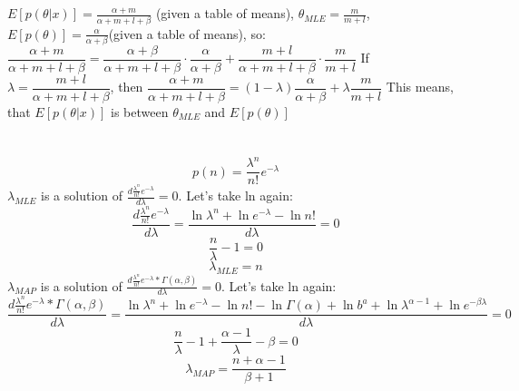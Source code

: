 \documentclass[11pt]{article}
\newcommand{\exercise}{\section{}}
\begin{document}
\exercise
$E[p(\theta|x)]=\frac{\alpha+m}{\alpha+m+l+\beta}$ (given a table of means), $\theta_{MLE}=\frac{m}{m+l}$, $E[p(\theta)]=\frac{\alpha}{\alpha+\beta}$(given a table of means), so: \newline
$\dfrac{\alpha+m}{\alpha+m+l+\beta}=\dfrac{\alpha+\beta}{\alpha+m+l+\beta}\cdot\dfrac{\alpha}{\alpha+\beta}+\dfrac{m+l}{\alpha+m+l+\beta}\cdot\dfrac{m}{m+l}$\newline\newline
If $\lambda=\dfrac{m+l}{\alpha+m+l+\beta}$, then $\dfrac{\alpha+m}{\alpha+m+l+\beta}=(1-\lambda)\dfrac{\alpha}{\alpha+\beta}+\lambda\dfrac{m}{m+l}$\newline
\newline
This means, that $E[p(\theta|x)]$ is between $\theta_{MLE}$ and $E[p(\theta)]$

\exercise
$$p(n) = \frac{\lambda^n}{n!}e^{-\lambda} $$
$\lambda_{MLE}$ is a solution of $\frac{d\frac{\lambda^n}{n!}e^{-\lambda}}{d\lambda}=0$. Let's take ln again: 
$$\frac{d\frac{\lambda^n}{n!}e^{-\lambda}}{d\lambda}=\frac{\ln{\lambda^n}+\ln{e^{-\lambda}}-\ln{n!}}{d\lambda}=0$$
$$\frac{n}{\lambda}-1=0$$
$$\lambda_{MLE}=n$$
$\lambda_{MAP}$ is a solution of $\frac{d\frac{\lambda^n}{n!}e^{-\lambda}*\Gamma(\alpha,\beta)}{d\lambda}=0$. Let's take ln again: 
$$\frac{d\frac{\lambda^n}{n!}e^{-\lambda}*\Gamma(\alpha,\beta)}{d\lambda}=\frac{\ln{\lambda^n}+\ln{e^{-\lambda}}-\ln{n!}-\ln{\Gamma(\alpha)}+\ln{b^a}+\ln{\lambda^{\alpha-1}}+\ln{e^{-\beta\lambda}}}{d\lambda}=0$$
$$\frac{n}{\lambda}-1+\frac{\alpha-1}{\lambda}-\beta=0$$
$$\lambda_{MAP}=\frac{n+\alpha-1}{\beta+1}$$
\end{document}
